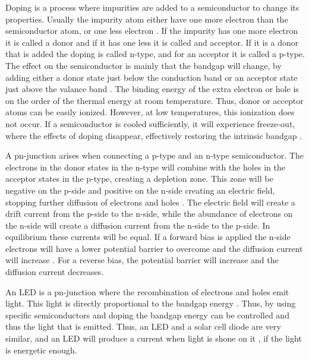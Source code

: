 Doping is a process where impurities are added to a semiconductor to change its properties. Usually the impurity atom either have one more electron than the semiconductor atom, or one less electron \cite{hofmann2015}. If the impurity has one more electron it is called a donor and if it has one less it is called and acceptor. If it is a donor that is added the doping is called n-type, and for an acceptor it is called a p-type. The effect on the semiconductor is mainly that the bandgap will change, by adding either a donor state just below the conduction band or an acceptor state just above the valance band \cite{hofmann2015}. The binding energy of the extra electron or hole is on the order of the thermal energy at room temperature. Thus, donor or acceptor atoms can be easily ionized. However, at low temperatures, this ionization does not occur. If a semiconductor is cooled sufficiently, it will experience freeze-out, where the effects of doping disappear, effectively restoring the intrinsic bandgap \cite{hofmann2015}.

A pn-junction arises when connecting a p-type and an n-type semiconductor. The electrons in the donor states in the n-type will combine with the holes in the acceptor states in the p-type, creating a depletion zone. This zone will be negative on the p-side and positive on the n-side creating an electric field, stopping further diffusion of electrons and holes \cite{hofmann2015}. The electric field will create a drift current from the p-side to the n-side, while the abundance of electrons on the n-side will create a diffusion current from the n-side to the p-side. In equilibrium these currents will be equal. If a forward bias is applied the n-side electrons will have a lower potential barrier to overcome and the diffusion current will increase \cite{hofmann2015}. For a reverse bias, the potential barrier will increase and the diffusion current decreases.

An LED is a pn-junction where the recombination of electrons and holes emit light. This light is directly proportional to the bandgap energy \cite{hofmann2015}. Thus, by using specific semiconductors and doping the bandgap energy can be controlled and thus the light that is emitted. Thus, an LED and a solar cell diode are very similar, and an LED will produce a current when light is shone on it \cite{hofmann2015}, if the light is energetic enough.